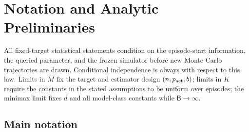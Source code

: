 \section{Notation and Analytic Preliminaries}\label{app:notation}

All fixed-target statistical statements condition on the episode-start information, the queried parameter, and the frozen simulator before new Monte Carlo trajectories are drawn.  Conditional independence is always with respect to this law.  Limits in $M$ fix the target and estimator design $(n,p_{\rm act},b)$; limits in $K$ require the constants in the stated assumptions to be uniform over episodes; the minimax limit fixes $d$ and all model-class constants while $\mathsf B\to\infty$.

\subsection{Main notation}

